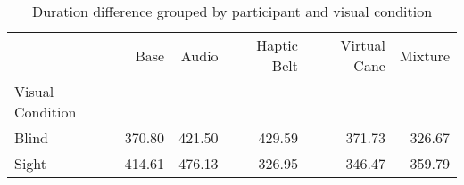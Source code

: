 
\begin{table}[!htb]
\centering
\caption{Duration difference grouped by participant and visual condition}
\label{tab:duracao_average_group}
\begin{tabular}{lrrrrr}
\toprule
{} &    Base &   Audio & Haptic Belt & Virtual Cane & Mixture \\
Visual Condition &         &         &             &              &         \\
\midrule
Blind            &  370.80 &  421.50 &      429.59 &       371.73 &  326.67 \\
Sight            &  414.61 &  476.13 &      326.95 &       346.47 &  359.79 \\
\bottomrule
\end{tabular}
\end{table}

